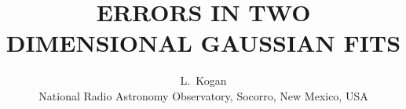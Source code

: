 \setlength{\topmargin}{-8mm}
\setlength{\textwidth}{160mm}
\setlength{\textheight}{220mm}
\setlength{\oddsidemargin}{0mm}
\setlength{\evensidemargin}{45mm}
\setlength{\parindent}{3em}
\setlength{\unitlength}{10mm}

\def\plotone#1{\begin{picture}(12,7)(-2,-0.8)
                  \centering \leavevmode
                  \epsfysize=6\unitlength \epsfbox{#1}
               \end{picture}}
\def\plottwo#1#2{\centering \leavevmode
                  \epsfxsize=5.5\unitlength \epsfbox{#1} \hfil
                  \epsfxsize=5.5\unitlength \epsfbox{#2}}
\newcommand{\nl}{\newline}

\title{\bf ERRORS IN TWO DIMENSIONAL GAUSSIAN FITS}
\vspace{2 mm}

\author{ L.~Kogan
\vspace{2 mm}\\
\small National Radio Astronomy Observatory, Socorro, New Mexico,
USA\\}
\vspace{2mm}


